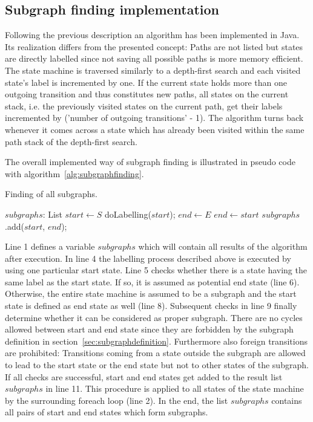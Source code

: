 \subsection{Subgraph finding implementation}
\label{sec:subgraphfindingimplementation}

Following the previous description an algorithm has been implemented in Java. Its realization differs from the presented concept: Paths are not listed but states are directly labelled since not saving all possible paths is more memory efficient.
The state machine is traversed similarly to a depth-first search and each visited state's label is incremented by one. If the current state holds more than one outgoing transition and thus constitutes new paths,  all states on the current stack, i.e. the previously visited states on the current path, get their labels incremented by ('number of outgoing transitions' - 1). The algorithm turns back whenever it comes across a state which has already been visited within the same path stack of the depth-first search.

The overall implemented way of subgraph finding is illustrated in pseudo code with algorithm~\ref{alg:subgraphfinding}.
\begin{algorithm}
\caption{Finding of all subgraphs.}
\label{alg:subgraphfinding}
\begin{algorithmic}[1]
\STATE $subgraphs$: List
  \STATE $start \leftarrow S$
	\STATE doLabelling($start$);
		\STATE $end \leftarrow E$
	\ELSE
		\STATE $end \leftarrow start$
	\ENDIF
		\STATE $subgraphs$.add($start$, $end$);
	\ENDIF
\ENDFOR
\end{algorithmic}
\end{algorithm}
Line 1 defines a variable $subgraphs$ which will contain all results of the algorithm after execution.
In line 4 the labelling process described above is executed by using one particular start state. Line 5 checks whether there is a state having the same label as the start state. If so, it is assumed as potential end state (line 6). Otherwise, the entire state machine is assumed to be a subgraph and the start state is defined as end state as well (line 8). Subsequent checks in line 9 finally determine whether it can be considered as proper subgraph.
There are no cycles allowed between start and end state since they are forbidden by the subgraph definition in section~\ref{sec:subgraphdefinition}.
Furthermore also foreign transitions are prohibited: Transitions coming from a state outside the subgraph are allowed to lead to the start state or the end state but not to other states of the subgraph. If all checks are successful, start and end states get added to the result list $subgraphs$ in line 11. This procedure is applied to all states of the state machine by the surrounding foreach loop (line 2). In the end, the list $subgraphs$ contains all pairs of start and end states which form subgraphs.


